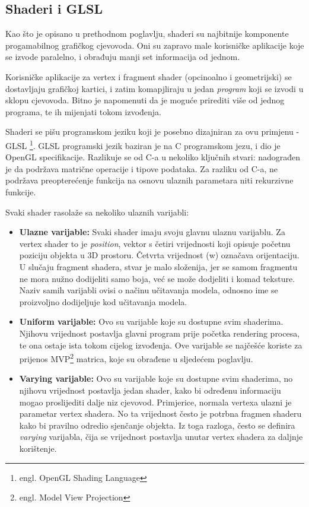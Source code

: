 \subsection{Shaderi i GLSL}

Kao što je opisano u prethodnom poglavlju, shaderi su najbitnije komponente progamabilnog grafičkog cjevovoda. Oni su zapravo male korisničke aplikacije koje se izvode paralelno, i obrađuju manji set informacija od jednom.

Korisničke aplikacije za vertex i fragment shader (opcinoalno i geometrijski) se dostavljaju grafičkoj kartici, i zatim komapjliraju u jedan \emph{program} koji se izvodi u sklopu cjevovoda. Bitno je napomenuti da je moguće prirediti više od jednog programa, te ih mijenjati tokom izvođenja.

Shaderi se pišu programskom jeziku koji je posebno dizajniran za ovu primjenu - GLSL \footnote{engl. OpenGL Shading Language}. GLSL programski jezik baziran je na C programskom jezu, i dio je OpenGL specifikacije. Razlikuje se od C-a u nekoliko ključnih stvari: nadograđen je da podržava matrične operacije i tipove podataka. Za razliku od C-a, ne podržava preopterećenje funkcija na osnovu ulaznih parametara niti rekurzivne funkcije.

Svaki shader rasolaže sa nekoliko ulaznih varijabli:

\begin{itemize}

\item \textbf{Ulazne varijable:} Svaki shader imaju svoju glavnu ulaznu varijablu. Za vertex shader to je \emph{position}, vektor s četiri vrijednosti koji opisuje početnu poziciju objekta u 3D prostoru. Četvrta vrijednost (w) označava orijentaciju. U slučaju fragment shadera, stvar je malo složenija, jer se samom fragmentu ne mora nužno dodijeliti samo boja, već se može dodjeliti i komad teksture. Naziv samih varijabli ovisi o načinu učitavanja modela, odnosno ime se proizvoljno dodijeljuje kod učitavanja modela.

\item \textbf{Uniform varijable:} Ovo su varijable koje su dostupne svim shaderima. Njihovu vrijednost postavlja glavni program prije početka rendering procesa, te ona ostaje ista tokom cijelog izvođenja. Ove varijable se najčešće koriste za prijenos MVP\footnote{engl. Model View Projection} matrica, koje su obrađene u sljedećem poglavlju.

\item \textbf{Varying varijable:} Ovo su varijable koje su dostupne svim shaderima, no njihovu vrijednost postavlja jedan shader, kako bi određenu informaciju mogao proslijediti dalje niz cjevovod. Primjerice, normala vertexa ulazni je parametar vertex shadera. No ta vrijednost često je potrbna fragmen shaderu kako bi pravilno odredio sjenčanje objekta. Iz toga razloga, često se definira \emph{varying} varijabla, čija se vrijednost postavlja unutar vertex shadera za daljnje korištenje.
\end{itemize}

